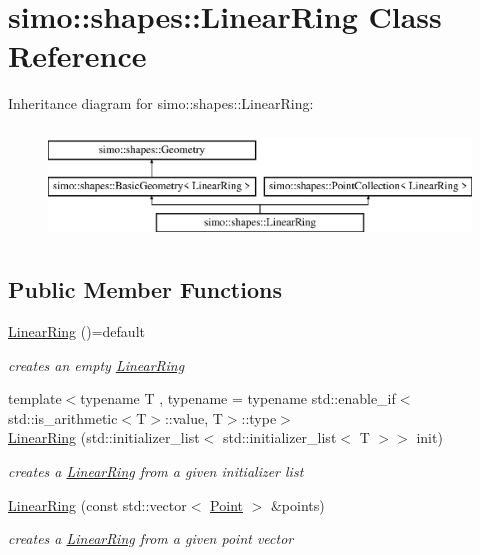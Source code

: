 \hypertarget{classsimo_1_1shapes_1_1_linear_ring}{\section{simo\-:\-:shapes\-:\-:Linear\-Ring Class Reference}
\label{classsimo_1_1shapes_1_1_linear_ring}
}
Inheritance diagram for simo\-:\-:shapes\-:\-:Linear\-Ring\-:\begin{figure}[H]
\begin{center}
\leavevmode
\includegraphics[height=3.000000cm]{classsimo_1_1shapes_1_1_linear_ring}
\end{center}
\end{figure}
\subsection*{Public Member Functions}
\begin{DoxyCompactItemize}
\item 
\hyperlink{classsimo_1_1shapes_1_1_linear_ring_a4d68d8f673858cd04fd281356f3240da}{Linear\-Ring} ()=default
\begin{DoxyCompactList}\small\item\em creates an empty \hyperlink{classsimo_1_1shapes_1_1_linear_ring}{Linear\-Ring} \end{DoxyCompactList}\item 
{\footnotesize template$<$typename T , typename  = typename std\-::enable\-\_\-if$<$std\-::is\-\_\-arithmetic$<$\-T$>$\-::value, T$>$\-::type$>$ }\\\hyperlink{classsimo_1_1shapes_1_1_linear_ring_afdbbd279927592af8eca93cdf9a401c2}{Linear\-Ring} (std\-::initializer\-\_\-list$<$ std\-::initializer\-\_\-list$<$ T $>$$>$ init)
\begin{DoxyCompactList}\small\item\em creates a \hyperlink{classsimo_1_1shapes_1_1_linear_ring}{Linear\-Ring} from a given initializer list \end{DoxyCompactList}\item 
\hyperlink{classsimo_1_1shapes_1_1_linear_ring_a58e04a921d9759ce1ae1c2d4912a4330}{Linear\-Ring} (const std\-::vector$<$ \hyperlink{classsimo_1_1shapes_1_1_point}{Point} $>$ \&points)
\begin{DoxyCompactList}\small\item\em creates a \hyperlink{classsimo_1_1shapes_1_1_linear_ring}{Linear\-Ring} from a given point vector \end{DoxyCompactList}\end{DoxyCompactItemize}
